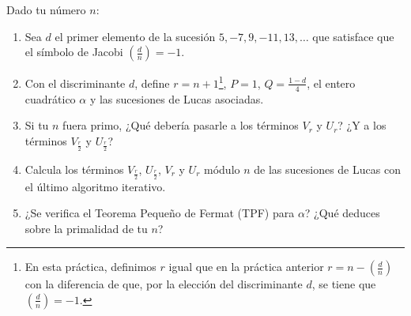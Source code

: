 	Dado tu número $n$:
	\begin{enumerate}
		\item Sea $d$ el primer elemento de la sucesión $5, -7, 9, -11, 13,\dots$ que satisface que el símbolo
		de Jacobi $\displaystyle \left(\frac{d}{n}\right) = -1$.
		\item Con el discriminante $d$, define $r = n+1$\footnote{En esta práctica, definimos $r$ igual que en
		la práctica anterior $r = n - \displaystyle \left(\frac{d}{n}\right)$ con la diferencia de que, por la
		elección del discriminante $d$, se tiene que $\displaystyle \left(\frac{d}{n}\right) = -1$.}, $P = 1$,
		$Q = \displaystyle \frac{1-d}{4}$, el entero cuadrático $\alpha$ y las sucesiones de Lucas asociadas.
		\item Si tu $n$ fuera primo, ¿Qué debería pasarle a los términos $V_r$ y $U_r$? ¿Y a los términos
		$V_{\frac{r}{2}}$ y $U_{\frac{r}{2}}$?
		\item Calcula los términos $V_{\frac{r}{2}}$, $U_{\frac{r}{2}}$, $V_r$ y $U_r$ módulo $n$ de las sucesiones
		de Lucas con el último algoritmo iterativo.
		\item ¿Se verifica el Teorema Pequeño de Fermat (TPF) para $\alpha$? ¿Qué deduces sobre la primalidad
		de tu $n$?
	\end{enumerate}

